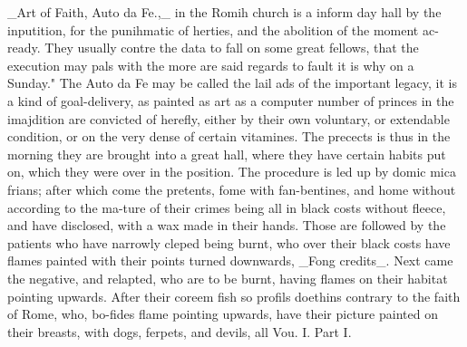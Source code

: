 \documentclass{article}
\begin{document}
\_Art of Faith, Auto da Fe.,\_ in the Romih church is a inform day hall by the inputition, for the punihmatic of herties, and the abolition of the moment ac- ready. They usually contre the data to fall on some great fellows, that the execution may pals with the more are said regards to fault it is why on a Sunday." The Auto da Fe may be called the lail ads of the important legacy, it is a kind of goal-delivery, as painted as art as a computer number of princes in the imajdition are convicted of herefly, either by their own voluntary, or extendable condition, or on the very dense of certain vitamines. The precects is thus in the morning they are brought into a great hall, where they have certain habits put on, which they were over in the position. The procedure is led up by domic mica frians; after which come the pretents, fome with fan-bentines, and home without according to the ma-ture of their crimes being all in black costs without fleece, and have disclosed, with a wax made in their hands. Those are followed by the patients who have narrowly cleped being burnt, who over their black costs have flames painted with their points turned downwards, \_Fong credits\_. Next came the negative, and relapted, who are to be burnt, having flames on their habitat pointing upwards. After their coreem fish so profils doethins contrary to the faith of Rome, who, bo-fides flame pointing upwards, have their picture painted on their breasts, with dogs, ferpets, and devils, all Vou. I. Part I.
\end{document}
